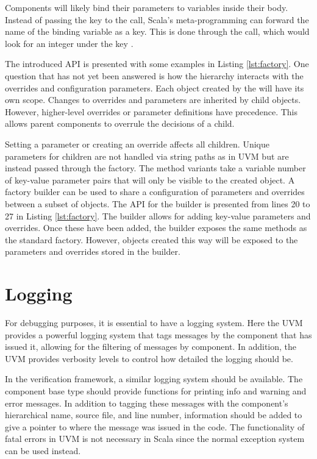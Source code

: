 Components will likely bind their parameters to variables inside their body. Instead of passing the key to the  call, Scala's meta-programming can forward the name of the binding variable as a key. This is done through the  call, which would look for an integer under the key .

The introduced API is presented with some examples in Listing \ref{lst:factory}. One question that has not yet been answered is how the hierarchy interacts with the overrides and configuration parameters. Each object created by the  will have its own scope. Changes to overrides and parameters are inherited by child objects. However, higher-level overrides or parameter definitions have precedence. This allows parent components to overrule the decisions of a child. 

Setting a parameter or creating an override affects all children. Unique parameters for children are not handled via string paths as in UVM but are instead passed through the factory. The  method variants take a variable number of key-value parameter pairs that will only be visible to the created object. A factory builder can be used to share a configuration of parameters and overrides between a subset of objects. The API for the builder is presented from lines 20 to 27 in Listing \ref{lst:factory}. The builder allows for adding key-value parameters and overrides. Once these have been added, the builder exposes the same  methods as the standard factory. However, objects created this way will be exposed to the parameters and overrides stored in the builder.



\section{Logging} %
\label{sec:logging}

For debugging purposes, it is essential to have a logging system. Here the UVM provides a powerful logging system
that tags messages by the component that has issued it, allowing for the filtering of messages by component. In
addition, the UVM provides verbosity levels to control how detailed the logging should be.

In the verification framework, a similar logging system should be available. The component base type should provide
functions for printing info and warning and error messages. In addition to tagging these messages with the component's
hierarchical name, source file, and line number, information should be added to give a pointer to where the message was
issued in the code. The functionality of fatal errors in UVM is not necessary in Scala since the normal exception system can
be used instead.



